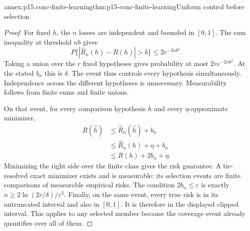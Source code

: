 \begin{annexitem}{annex:p15.conc-finite-learning}{thm:p15-conc-finite-learning}{Uniform control before selection}
\begin{proof}
For fixed \(h\), the \(n\) losses are independent and
bounded in \([0,1]\). The sum inequality at threshold
\(nb\) gives
\[
 P\{|\widehat R_n(h)-R(h)|>b\}\leq2e^{-2nb^2}.
\]
Taking a union over the \(r\) fixed hypotheses gives
probability at most \(2r e^{-2nb^2}\).
At the stated \(b_n\) this is \(\delta\).
The event thus controls every hypothesis simultaneously.
Independence across the different hypotheses is unnecessary.
Measurability follows from finite sums and finite unions.

On that event, for every comparison hypothesis \(h\)
and every \(\eta\)-approximate minimizer,
\[
 \begin{split}
 R(\widehat h)
 &\leq\widehat R_n(\widehat h)+b_n\\
 &\leq\widehat R_n(h)+\eta+b_n\\
 &\leq R(h)+2b_n+\eta.
 \end{split}
\]
Minimizing the right side over the finite class gives
the risk guarantee. A tie-resolved exact minimizer
exists and is measurable: its selection events are
finite comparisons of measurable empirical risks.
The condition \(2b_n\leq\varepsilon\) is exactly
\(n\geq2\ln(2r/\delta)/\varepsilon^2\).
Finally, on the same event, every true risk is in
its untruncated interval and also in \([0,1]\).
It is therefore in the displayed clipped interval.
This applies to any selected member because the
coverage event already quantifies over all of them.
\end{proof}
\end{annexitem}

